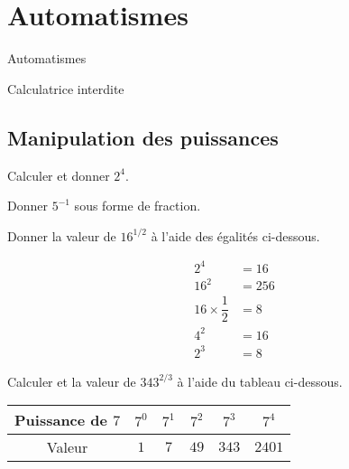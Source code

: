 \documentclass[14pt]{beamer}
\begin{document}
\section{Automatismes}

\begin{frame}

\centering \huge
Automatismes

\large
Calculatrice interdite

\end{frame}

\subsection{Manipulation des puissances}

\begin{frame}{1}
	\centering
    Calculer et donner $2^4$.
\end{frame}

\begin{frame}{2}
	\centering
    Donner $5^{-1}$ sous forme de fraction.
\end{frame}

\begin{frame}{3}
	\centering
    Donner la valeur de $16^{1/2}$ à l'aide des égalités ci-dessous.

    \vfill
    \begin{align*}
        2^4 &= 16 \\
        16^2 &= 256 \\
        16\times \dfrac12 &= 8 \\
        4^2 &= 16 \\
        2^3 &= 8
    \end{align*}
\end{frame}

\begin{frame}{4}
	\centering
    Calculer et la valeur de $343^{2/3}$ à l'aide du tableau ci-dessous.

    \vfill
    \begin{tabular}{|c|c|c|c|c|c|} \hline
        Puissance de $7$ & $7^0$ & $7^1$ & $7^2$ & $7^3$ & $7^4$ \\ \hline
        Valeur & $1$ & $7$ & $49$ & $343$ & $2401$ \\ \hline
    \end{tabular}
\end{frame}
\end{document}
